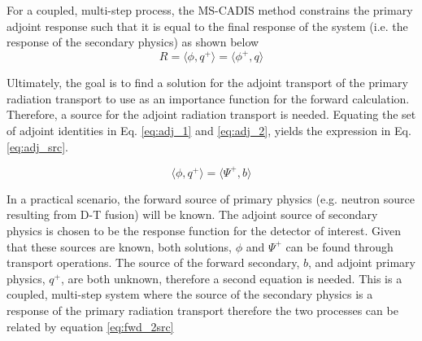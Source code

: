For a coupled, multi-step process, the MS-CADIS method 
constrains the primary adjoint response such that it is equal to  
the final response of the system (i.e. the response of the secondary physics) as shown below
 \begin{equation}\label{eq:adj_1}
	 R = \langle \phi, q^{+} \rangle =
		\langle \phi^{+} , q \rangle
 \end{equation}

	 
 

Ultimately, the goal is to find a solution for the adjoint
transport of the primary radiation transport to use as an importance
function for the forward calculation. Therefore, a
source for the adjoint radiation transport is needed.  Equating the set of adjoint
identities in Eq. \ref{eq:adj_1} and \ref{eq:adj_2}, yields the expression in Eq.
\ref{eq:adj_src}.

 \begin{equation}\label{eq:adj_src}
	 \langle \phi, q^{+} \rangle =
	 \langle \Psi^{+}, b \rangle
 \end{equation}

In a practical scenario, the forward source of primary physics (e.g. neutron
source resulting from D-T fusion) will be known.  
The adjoint source of secondary physics is chosen to be the response function for the
detector of interest.
Given that these sources are known, both solutions, $ \phi $ and
$\Psi^{+} $ can be found through transport operations.
The source of the forward secondary, $b$,  and adjoint primary physics,
$q^{+}$, are both unknown, therefore a second equation is needed.  
This is a coupled, multi-step system where the source of the secondary physics is
a response of the primary radiation transport therefore the two processes can be related
by equation \ref{eq:fwd_2src}

